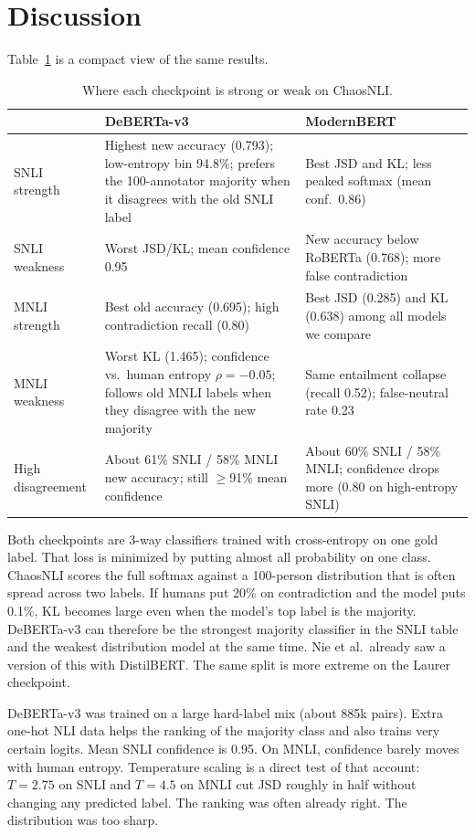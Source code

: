 \documentclass[11pt,a4paper]{article}
\begin{document}
\section{Discussion}

Table~\ref{tab:strengths} is a compact view of the same results.

\begin{table}[H]
\centering
\small
\caption{Where each checkpoint is strong or weak on ChaosNLI.}
\label{tab:strengths}
\begin{tabular}{p{2.4cm}p{5.4cm}p{5.4cm}}
\toprule
 & DeBERTa-v3 & ModernBERT \\
\midrule
SNLI strength & Highest new accuracy (0.793); low-entropy bin 94.8\%; prefers the 100-annotator majority when it disagrees with the old SNLI label & Best JSD and KL; less peaked softmax (mean conf.\ 0.86) \\
SNLI weakness & Worst JSD/KL; mean confidence 0.95 & New accuracy below RoBERTa (0.768); more false contradiction \\
MNLI strength & Best old accuracy (0.695); high contradiction recall (0.80) & Best JSD (0.285) and KL (0.638) among all models we compare \\
MNLI weakness & Worst KL (1.465); confidence vs.\ human entropy $\rho=-0.05$; follows old MNLI labels when they disagree with the new majority & Same entailment collapse (recall 0.52); false-neutral rate 0.23 \\
High disagreement & About 61\% SNLI / 58\% MNLI new accuracy; still $\ge$91\% mean confidence & About 60\% SNLI / 58\% MNLI; confidence drops more (0.80 on high-entropy SNLI) \\
\bottomrule
\end{tabular}
\end{table}

Both checkpoints are 3-way classifiers trained with cross-entropy on one gold label. That loss is minimized by putting almost all probability on one class. ChaosNLI scores the full softmax against a 100-person distribution that is often spread across two labels. If humans put 20\% on contradiction and the model puts 0.1\%, KL becomes large even when the model's top label is the majority. DeBERTa-v3 can therefore be the strongest majority classifier in the SNLI table and the weakest distribution model at the same time. Nie et al.\ already saw a version of this with DistilBERT. The same split is more extreme on the Laurer checkpoint.

DeBERTa-v3 was trained on a large hard-label mix (about 885k pairs). Extra one-hot NLI data helps the ranking of the majority class and also trains very certain logits. Mean SNLI confidence is 0.95. On MNLI, confidence barely moves with human entropy. Temperature scaling is a direct test of that account: $T=2.75$ on SNLI and $T=4.5$ on MNLI cut JSD roughly in half without changing any predicted label. The ranking was often already right. The distribution was too sharp.
\end{document}
